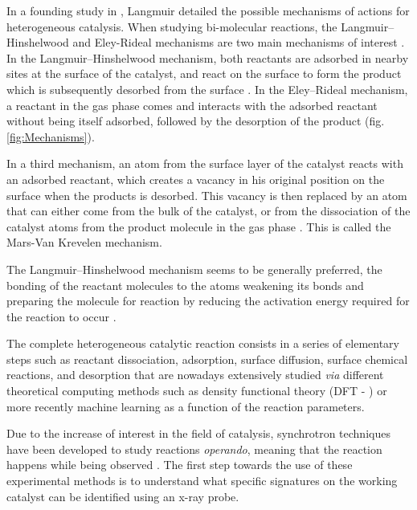 In a founding study in \cite*{Langmuir1922}, Langmuir detailed the possible mechanisms of actions for heterogeneous catalysis.
When studying bi-molecular reactions, the Langmuir–Hinshelwood and Eley-Rideal mechanisms are two main mechanisms of interest \parencite{Bratan2022}.
In the Langmuir–Hinshelwood mechanism, both reactants are adsorbed in nearby sites at the surface of the catalyst, and react on the surface to form the product which is subsequently desorbed from the surface \parencite{Prins2018, ROSS2019}.
In the Eley–Rideal mechanism, a reactant in the gas phase comes and interacts with the adsorbed reactant without being itself adsorbed, followed by the desorption of the product \parencite{Rideal1939, Weinberg1996}  (fig. \ref{fig:Mechanisms}).

In a third mechanism, an atom from the surface layer of the catalyst reacts with an adsorbed reactant, which creates a vacancy in his original position on the surface when the products is desorbed.
This vacancy is then replaced by an atom that can either come from the bulk of the catalyst, or from the dissociation of the catalyst atoms from the product molecule in the gas phase \parencite{Mars1954, Doornkamp2000}.
This is called the Mars-Van Krevelen mechanism.

The Langmuir–Hinshelwood mechanism seems to be generally preferred, the bonding of the reactant molecules to the atoms weakening its bonds and preparing the molecule for reaction by reducing the activation energy required for the reaction to occur \parencite{Baxter2002}.

The complete heterogeneous catalytic reaction consists in a series of elementary steps such as reactant dissociation, adsorption, surface diffusion, surface chemical reactions, and desorption that are nowadays extensively studied \textit{via} different theoretical computing methods such as density functional theory (DFT - \cite{Reuter2004, Molenbroek2009, Yawei2015, Gaggioli2019, Chatelier2020}) or more recently machine learning \parencite{Kitchin2018, Schlexer2019, Anstine2023} as a function of the reaction parameters.

Due to the increase of interest in the field of catalysis, synchrotron techniques have been developed to study reactions \textit{operando}, meaning that the reaction happens while being observed \parencite{Meirer2018}.
The first step towards the use of these experimental methods is to understand what specific signatures on the working catalyst can be identified using an x-ray probe.

